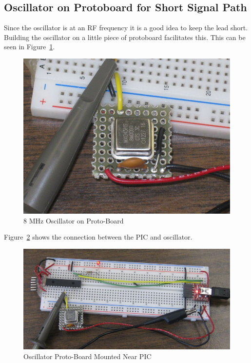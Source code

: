 \documentclass[twocolumn]{article}
\makeatletter
\def\maxwidth{\ifdim\Gin@nat@width>\linewidth\linewidth
\else\Gin@nat@width\fi}
\let\Oldincludegraphics\includegraphics
\renewcommand{\includegraphics}[1]{\Oldincludegraphics[width=\maxwidth]{#1}}
\makeatother
\begin{document}
\subsection{Oscillator on Protoboard for Short Signal Path}

Since the oscillator is at an RF frequency it is a good idea to keep the
lead short. Building the oscillator on a little piece of protoboard
facilitates this. This can be seen in Figure~\ref{osc8mhzproto}.

\begin{figure}[htbp]
\centering
\includegraphics{phys1600/osc_proto.jpg}
\caption{8 MHz Oscillator on Proto-Board}
\label{osc8mhzproto}
\end{figure}

Figure~\ref{osc8mhzprotopic} shows the connection between the PIC and oscillator.

\begin{figure}[htbp]
\centering
\includegraphics{phys1600/osc_proto_pic.jpg}
\caption{Oscillator Proto-Board Mounted Near PIC}
\label{osc8mhzprotopic}
\end{figure}
\end{document}
